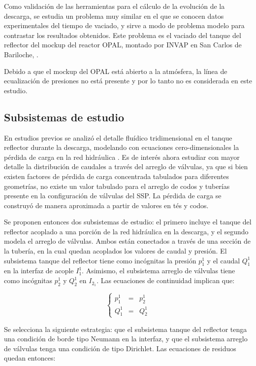 Como validación de las herramientas para el cálculo de la evolución de la descarga,
se estudia un problema muy similar en el que se conocen datos experimentales del tiempo de vaciado,
y sirve a modo de problema modelo para contrastar los resultados obtenidos.
Este problema es el vaciado del tanque del reflector del mockup del reactor OPAL, 
montado por INVAP en San Carlos de Bariloche, \cite{invap-mockup}.

Debido a que el mockup del OPAL está abierto a la atmósfera, la línea de ecualización de presiones no está presente y
por lo tanto no es considerada en este estudio.

\subsection*{Subsistemas de estudio}

En estudios previos se analizó el detalle fluídico tridimensional en el tanque reflector durante la descarga,
modelando con ecuaciones cero-dimensionales la pérdida de carga en la red hidráulica \cite{rechiman}.
Es de interés ahora estudiar con mayor detalle la distribución de caudales a través del arreglo de válvulas,
ya que si bien existen factores de pérdida de carga concentrada tabulados para diferentes geometrías,
no existe un valor tabulado para el arreglo de codos y tuberías presente en la configuración de válvulas del SSP.
La pérdida de carga se construyó de manera aproximada a partir de valores en tés y codos.

Se proponen entonces dos subsistemas de estudio:
el primero incluye el tanque del reflector acoplado a una porción de la red hidráulica en la descarga,
y el segundo modela el arreglo de válvulas.
Ambos están conectados a través de una sección de la tubería,
en la cual quedan acoplados los valores de caudal y presión.
El subsistema tanque del reflector tiene como incógnitas la presión $p_1^1$ y el caudal $Q_1^1$ en la interfaz de acople $I_1^1$.
Asimismo, el subsistema arreglo de válvulas tiene como incógnitas $p_2^1$ y $Q_2^1$ en $I_2_1$.
Las ecuaciones de continuidad implican que:

\begin{equation}
\left\{ \begin{array}{rcl}
p_1^1 &=& p_2^1 \\
Q_1^1 &=& Q_2^1
\end{array}
\right.
\end{equation}

Se selecciona la siguiente estrategia:
que el subsistema tanque del reflector tenga una condición de borde tipo Neumann en la interfaz,
y que el subsistema arreglo de válvulas tenga una condición de tipo Dirichlet.
Las ecuaciones de residuos quedan entonces:

